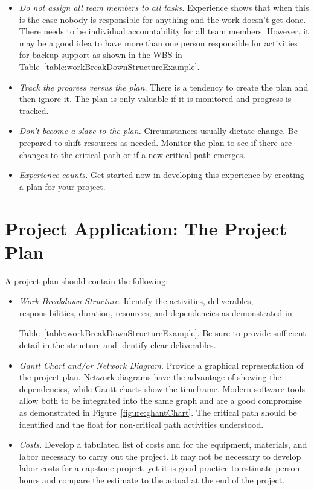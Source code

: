 \begin{itemize}
\item
  \emph{Do not assign all team members to all tasks.} Experience shows
  that when this is the case nobody is responsible for anything and the
  work doesn't get done. There needs to be individual accountability for
  all team members. However, it may be a good idea to have more than one
  person responsible for activities for backup support as shown in the
  WBS in Table~\ref{table:workBreakDownStructureExample}.
\item
  \emph{Track the progress versus the plan.} There is a tendency to
  create the plan and then ignore it. The plan is only valuable if it is
  monitored and progress is tracked.
\item
  \emph{Don't become a slave to the plan.} Circumstances usually dictate
  change. Be prepared to shift resources as needed. Monitor the plan to
  see if there are changes to the critical path or if a new critical
  path emerges.
\item
  \emph{Experience counts.} Get started now in developing this
  experience by creating a plan for your project.
\end{itemize}

\section{Project Application: The Project Plan}
\label{section:project-application-the-project-plan}

A project plan should contain the following:

\begin{itemize}
\item
  \emph{Work Breakdown Structure}. Identify the activities,
  deliverables, responsibilities, duration, resources, and dependencies
  as demonstrated in 

Table~\ref{table:workBreakDownStructureExample}. Be sure to 
provide sufficient detail in
  the structure and identify clear deliverables.
\item
  \emph{Gantt Chart and/or Network Diagram.} Provide a graphical
  representation of the project plan. Network diagrams have the
  advantage of showing the dependencies, while Gantt charts show the
  timeframe. Modern software tools allow both to be integrated into the
  same graph and are a good compromise as demonstrated in 
Figure~\ref{figure:ghantChart}.
  The critical path should be identified and the float for non-critical
  path activities understood.
\item
  \emph{Costs.} Develop a tabulated list of costs and for the equipment,
  materials, and labor necessary to carry out the project. It may not be
  necessary to develop labor costs for a capstone project, yet it is
  good practice to estimate person-hours and compare the estimate to the
  actual at the end of the project.
\end{itemize}

